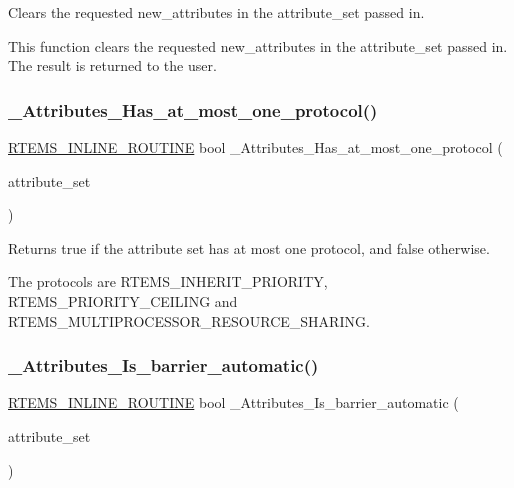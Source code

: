 Clears the requested new\+\_\+attributes in the attribute\+\_\+set passed in. 

This function clears the requested new\+\_\+attributes in the attribute\+\_\+set passed in. The result is returned to the user. \mbox{\label{group__ClassicAttributesImpl_gae2a3aee90c04eff42efa771aedcec1cf}} 
\subsubsection{\texorpdfstring{\_Attributes\_Has\_at\_most\_one\_protocol()}{\_Attributes\_Has\_at\_most\_one\_protocol()}}
{\footnotesize\ttfamily \mbox{\hyperlink{group__RTEMSScoreBaseDefs_gac216239df231d5dbd15e3520b0b9313f}{R\+T\+E\+M\+S\+\_\+\+I\+N\+L\+I\+N\+E\+\_\+\+R\+O\+U\+T\+I\+NE}} bool \+\_\+\+Attributes\+\_\+\+Has\+\_\+at\+\_\+most\+\_\+one\+\_\+protocol (\begin{DoxyParamCaption}\item[{\mbox{\hyperlink{group__ClassicAttributes_gaea40313cf78ed843e09c4315d0a10f79}{rtems\+\_\+attribute}}}]{attribute\+\_\+set }\end{DoxyParamCaption})}



Returns true if the attribute set has at most one protocol, and false otherwise. 

The protocols are R\+T\+E\+M\+S\+\_\+\+I\+N\+H\+E\+R\+I\+T\+\_\+\+P\+R\+I\+O\+R\+I\+TY, R\+T\+E\+M\+S\+\_\+\+P\+R\+I\+O\+R\+I\+T\+Y\+\_\+\+C\+E\+I\+L\+I\+NG and R\+T\+E\+M\+S\+\_\+\+M\+U\+L\+T\+I\+P\+R\+O\+C\+E\+S\+S\+O\+R\+\_\+\+R\+E\+S\+O\+U\+R\+C\+E\+\_\+\+S\+H\+A\+R\+I\+NG. \mbox{\label{group__ClassicAttributesImpl_ga40889ebe1ba24369464c3b8d01d8a0a5}} 
\subsubsection{\texorpdfstring{\_Attributes\_Is\_barrier\_automatic()}{\_Attributes\_Is\_barrier\_automatic()}}
{\footnotesize\ttfamily \mbox{\hyperlink{group__RTEMSScoreBaseDefs_gac216239df231d5dbd15e3520b0b9313f}{R\+T\+E\+M\+S\+\_\+\+I\+N\+L\+I\+N\+E\+\_\+\+R\+O\+U\+T\+I\+NE}} bool \+\_\+\+Attributes\+\_\+\+Is\+\_\+barrier\+\_\+automatic (\begin{DoxyParamCaption}\item[{\mbox{\hyperlink{group__ClassicAttributes_gaea40313cf78ed843e09c4315d0a10f79}{rtems\+\_\+attribute}}}]{attribute\+\_\+set }\end{DoxyParamCaption})}



